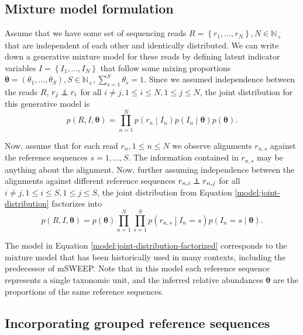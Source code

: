 \documentclass[officiallayout]{tktla}
\newcommand\indept{\protect\mathpalette{\protect\independenT}{\perp}}
\def\independenT#1#2{\mathrel{\rlap{$#1#2$}\mkern2mu{#1#2}}}
\begin{document}
\subsection{Mixture model formulation}

Assume that we have some set of sequencing reads $R = \left\{r_{1},
\dots, r_{N}\right\}, N \in \mathbb{N}_{+}$ that are independent of
each other and identically distributed. We can write down a generative
mixture model for these reads by defining latent indicator variables
$I = \left\{I_{1}, \dots, I_{N}\right\}$ that follow some mixing
proportions $\boldsymbol{\theta} = \left(\theta_{1}, \dots,
\theta_{S}\right), S \in \mathbb{N}_{+}, \sum_{s = 1}^{S} \theta_{s} =
1$. Since we assumed independence between the reads $R$, $r_{j}
\indept r_{i}$ for all $i \neq j, 1 \leq i \leq N, 1 \leq j \leq N$, the joint
distribution for this generative model is
\begin{equation}
  \label{model:joint-distribution}
  p\left(R, I, \boldsymbol\theta\right) = \prod_{n = 1}^{N}p\left(r_{n} \middle| I_{n}\right) p\left(I_{n} \middle| \boldsymbol\theta\right)p\left(\boldsymbol\theta\right).
\end{equation}

Now, assume that for each read $r_{n}, 1 \leq n \leq N$ we observe
alignments $r_{n, s}$ against the reference sequences $s = 1, \dots,
S$. The information contained in $r_{n, s}$ may be anything about the
alignment. Now, further assuming independence between the alignments
against different reference sequences $r_{n, i} \indept r_{n, j}$ for
all $i \neq j, 1 \leq i \leq S, 1 \leq j \leq S$, the joint
distribution from Equation \ref{model:joint-distribution} factorizes
into
\begin{equation}
  \label{model:joint-distribution-factorized}
  p\left(R, I, \boldsymbol\theta\right) = p\left(\boldsymbol\theta\right)\prod_{n = 1}^{N} \prod_{s = 1}^{S} p\left(r_{n, s} \middle| I_{n} = s\right) p\left(I_{n} = s \middle| \boldsymbol\theta\right).
\end{equation}

The model in Equation \ref{model:joint-distribution-factorized}
corresponds to the mixture model that has been historically used in
many contexts, including the predecessor of mSWEEP. Note that in this
model each reference sequence represents a single taxonomic unit, and
the inferred relative abundances $\boldsymbol\theta$ are the
proportions of the same reference sequences.

\subsection{Incorporating grouped reference sequences}
\end{document}
